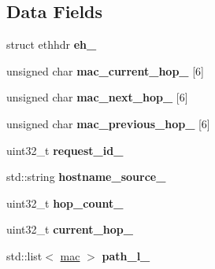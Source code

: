 \subsection*{Data Fields}
\begin{DoxyCompactItemize}
\item 
\hypertarget{classRouteResponse_a094f4f46526b2efca6cba02d02d2b5a1}{struct ethhdr {\bfseries eh\-\_\-}}\label{classRouteResponse_a094f4f46526b2efca6cba02d02d2b5a1}

\item 
\hypertarget{classRouteResponse_a9c4ac4d3e69ade05d76debd85b31f9aa}{unsigned char {\bfseries mac\-\_\-current\-\_\-hop\-\_\-} \mbox{[}6\mbox{]}}\label{classRouteResponse_a9c4ac4d3e69ade05d76debd85b31f9aa}

\item 
\hypertarget{classRouteResponse_af4b40eb0ae85e1c7bf6c92adac9183fd}{unsigned char {\bfseries mac\-\_\-next\-\_\-hop\-\_\-} \mbox{[}6\mbox{]}}\label{classRouteResponse_af4b40eb0ae85e1c7bf6c92adac9183fd}

\item 
\hypertarget{classRouteResponse_a43362637d4898bd5e9b907970243e85a}{unsigned char {\bfseries mac\-\_\-previous\-\_\-hop\-\_\-} \mbox{[}6\mbox{]}}\label{classRouteResponse_a43362637d4898bd5e9b907970243e85a}

\item 
\hypertarget{classRouteResponse_aee9346caf4415e846614655426e7dcd0}{uint32\-\_\-t {\bfseries request\-\_\-id\-\_\-}}\label{classRouteResponse_aee9346caf4415e846614655426e7dcd0}

\item 
\hypertarget{classRouteResponse_a0bb239b2ce9e40b4b0187e379d7fa732}{std\-::string {\bfseries hostname\-\_\-source\-\_\-}}\label{classRouteResponse_a0bb239b2ce9e40b4b0187e379d7fa732}

\item 
\hypertarget{classRouteResponse_ada7f69348aaa0f1eadb5f2b84a06b812}{uint32\-\_\-t {\bfseries hop\-\_\-count\-\_\-}}\label{classRouteResponse_ada7f69348aaa0f1eadb5f2b84a06b812}

\item 
\hypertarget{classRouteResponse_a3b0c2b5dffbbbd2a1a6364e68d5ea318}{uint32\-\_\-t {\bfseries current\-\_\-hop\-\_\-}}\label{classRouteResponse_a3b0c2b5dffbbbd2a1a6364e68d5ea318}

\item 
\hypertarget{classRouteResponse_a65445b7f0ce2cdcc77c4aa3cc985a4d7}{std\-::list$<$ \hyperlink{structmac}{mac} $>$ {\bfseries path\-\_\-l\-\_\-}}\label{classRouteResponse_a65445b7f0ce2cdcc77c4aa3cc985a4d7}


\end{DoxyCompactItemize}
